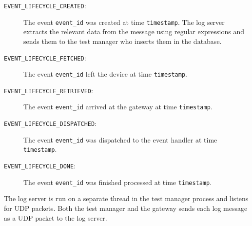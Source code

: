 \begin{description}

\item[\texttt{EVENT\_LIFECYCLE\_CREATED}:] The event \texttt{event\_id} was
created at time \texttt{timestamp}. The log server extracts the relevant data
from the message using regular expressions and sends them to the test manager
who inserts them in the database.

\item[\texttt{EVENT\_LIFECYCLE\_FETCHED}:] The event \texttt{event\_id} left
the device at time \texttt{timestamp}.

\item[\texttt{EVENT\_LIFECYCLE\_RETRIEVED}:] The event \texttt{event\_id}
arrived at the gateway at time \texttt{timestamp}.

\item[\texttt{EVENT\_LIFECYCLE\_DISPATCHED}:] The event \texttt{event\_id} was
dispatched to the event handler at time \texttt{timestamp}.

\item[\texttt{EVENT\_LIFECYCLE\_DONE}:] The event \texttt{event\_id} was
finished processed at time \texttt{timestamp}.

\end{description}

The log server is run on a separate thread in the test manager process and
listens for UDP packets. Both the test manager and the gateway sends each
log message as a UDP packet to the log server.

